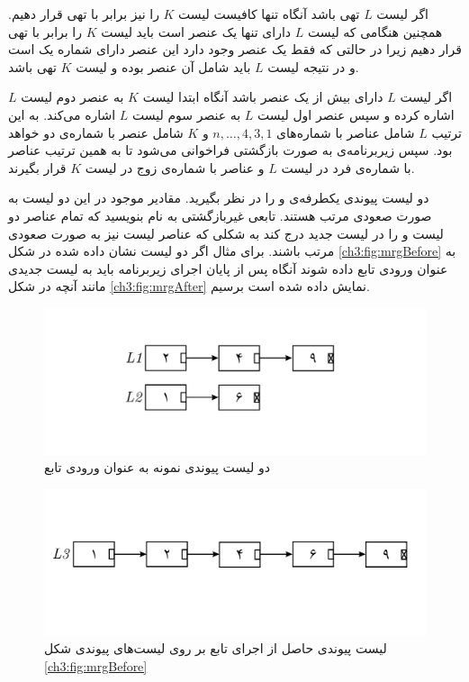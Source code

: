 اگر لیست {$L$} تهی باشد آنگاه تنها کافیست لیست {$K$} را نیز برابر با تهی قرار دهیم. همچنین هنگامی که لیست {$L$} دارای تنها یک عنصر است  باید لیست {$K$} را برابر با تهی قرار دهیم زیرا در حالتی که فقط یک عنصر وجود دارد این عنصر دارای شماره یک است و در نتیجه لیست {$L$} باید شامل آن عنصر بوده و لیست {$K$} تهی باشد.

اگر لیست {$L$} دارای بیش از یک عنصر باشد آنگاه ابتدا لیست {$K$} به عنصر دوم لیست {$L$} اشاره کرده و سپس عنصر اول لیست {$L$} به عنصر سوم لیست {$L$} اشاره می‌کند. به این ترتیب {$L$} شامل عناصر با شماره‌های {$n ,\ldots , 4,3,1$}  و {$K$} شامل عنصر با شماره‌ی دو خواهد بود. سپس زیربرنامه‌ی {} به صورت بازگشتی  فراخوانی می‌شود تا به همین ترتیب عناصر با شماره‌ی فرد در لیست {$L$} و عناصر با شماره‌ی زوج در لیست {$K$} قرار بگیرند.

 دو لیست پیوندی یکطرفه‌ی {} و {} را در نظر بگیرید. مقادیر موجود در این دو لیست به صورت صعودی مرتب هستند. تابعی غیربازگشتی به نام {} بنویسید که تمام عناصر دو لیست {} و {} را در لیست جدید {} درج کند به شکلی که عناصر لیست {} نیز به صورت صعودی مرتب باشند. برای مثال اگر دو لیست نشان داده شده در شکل {\eqref{ch3:fig:mrgBefore}} به عنوان ورودی تابع {} داده شوند آنگاه پس از پایان اجرای زیربرنامه باید به لیست جدیدی مانند آنچه در شکل {\eqref{ch3:fig:mrgAfter}} نمایش داده شده است برسیم.

\begin{figure}[H]
\begin{center}
\includegraphics[scale=0.33]{figs/ch3/merge_input_lists.pdf}
\caption{دو لیست پیوندی نمونه به عنوان ورودی تابع {}}\label{ch3:fig:mrgBefore}
\end{center}
\end{figure}

\begin{figure}[H]
\begin{center}
\includegraphics[scale=0.33]{figs/ch3/merge_output_list.pdf}
\caption{%
لیست پیوندی حاصل از اجرای تابع {} بر روی لیست‌های پیوندی شکل {\eqref{ch3:fig:mrgBefore}}
}
\label{ch3:fig:mrgAfter}
\end{center}
\end{figure}

